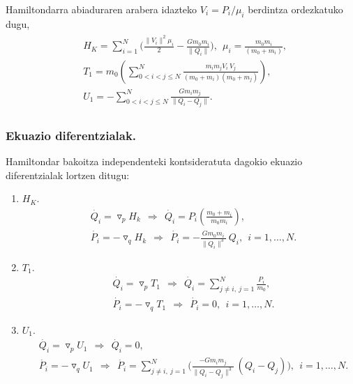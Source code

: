 Hamiltondarra abiaduraren arabera idazteko $V_i=P_i/\mu_i$ berdintza ordezkatuko dugu,
\begin{align}
\begin{split}
\label{eq:nbodyHel}
&H_K=\sum\limits_{i=1}^{N}\bigg(\frac{\|V_i\|^2 \mu_i}{2} -\frac{G m_0 m_i}{\|Q_i\|}\bigg), \ \ \mu_i=\frac{m_0m_i}{(m_0+m_i)}, \\
&T_1=m_0 \left(\sum\limits_{0<i<j\le N}^{N} \frac{m_i m_j V_i\ V_j}{(m_0+m_i)(m_0+m_j)} \right),\\
&U_1= -\sum\limits_{0< i<j\le N}^{N} \frac{G m_i m_j}{\|Q_i-Q_j\|}.
\end{split}
\end{align}

\subsubsection*{Ekuazio diferentzialak.}

Hamiltondar bakoitza independenteki kontsideratuta dagokio ekuazio diferentzialak lortzen ditugu:
\begin{enumerate}
\item $H_K$.
\begin{align*}
&\dot{Q_i} = \triangledown_p H_k \ \ \Rightarrow \ \  \dot{Q_i}=P_i\left(\frac{m_0+m_i}{m_0m_i}\right), \\
&\dot{P_i} = -\triangledown_q H_k \ \ \Rightarrow \ \  \dot{P_i}= - \frac{G m_0m_i}{\|Q_i\|^3 }\ Q_i, \ \ i=1,\dots, N.
\end{align*}

\item $T_1$.
\begin{align*}
&\dot{Q_i} = \triangledown_p T_1 \ \ \Rightarrow \ \  \dot{Q_i}=\sum\limits_{j\ne i,\ j=1}^{N} \frac{P_i}{m_0}, \\
&\dot{P_i} = -\triangledown_q T_1 \ \ \Rightarrow \ \  \dot{P_i}= 0, \ \ i=1,\dots, N.
\end{align*}

\item $U_1$.
\begin{align*}
&\dot{Q_i} = \triangledown_p U_1 \ \ \Rightarrow \ \  \dot{Q_i}=0, \\
&\dot{P_i} = -\triangledown_q U_1 \ \ \Rightarrow \ \ 
 \dot{P_i}= \sum\limits_{j \ne i , \ j=1}^{N} \bigg(\frac{-Gm_im_j}{\|Q_i-Q_j\|^3} \ (Q_i-Q_j) \bigg), \ \ i=1,\dots, N.
\end{align*}

\end{enumerate}

